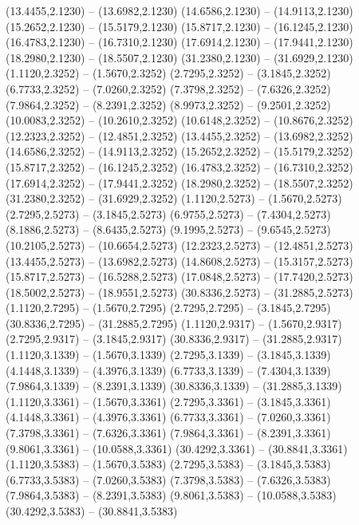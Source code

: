 {\begin{scope}[shift={(#1,#2)}]
    (13.4455,2.1230) -- (13.6982,2.1230)
    (14.6586,2.1230) -- (14.9113,2.1230)
    (15.2652,2.1230) -- (15.5179,2.1230)
    (15.8717,2.1230) -- (16.1245,2.1230)
    (16.4783,2.1230) -- (16.7310,2.1230)
    (17.6914,2.1230) -- (17.9441,2.1230)
    (18.2980,2.1230) -- (18.5507,2.1230)
    (31.2380,2.1230) -- (31.6929,2.1230)
    (1.1120,2.3252) -- (1.5670,2.3252)
    (2.7295,2.3252) -- (3.1845,2.3252)
    (6.7733,2.3252) -- (7.0260,2.3252)
    (7.3798,2.3252) -- (7.6326,2.3252)
    (7.9864,2.3252) -- (8.2391,2.3252)
    (8.9973,2.3252) -- (9.2501,2.3252)
    (10.0083,2.3252) -- (10.2610,2.3252)
    (10.6148,2.3252) -- (10.8676,2.3252)
    (12.2323,2.3252) -- (12.4851,2.3252)
    (13.4455,2.3252) -- (13.6982,2.3252)
    (14.6586,2.3252) -- (14.9113,2.3252)
    (15.2652,2.3252) -- (15.5179,2.3252)
    (15.8717,2.3252) -- (16.1245,2.3252)
    (16.4783,2.3252) -- (16.7310,2.3252)
    (17.6914,2.3252) -- (17.9441,2.3252)
    (18.2980,2.3252) -- (18.5507,2.3252)
    (31.2380,2.3252) -- (31.6929,2.3252)
    (1.1120,2.5273) -- (1.5670,2.5273)
    (2.7295,2.5273) -- (3.1845,2.5273)
    (6.9755,2.5273) -- (7.4304,2.5273)
    (8.1886,2.5273) -- (8.6435,2.5273)
    (9.1995,2.5273) -- (9.6545,2.5273)
    (10.2105,2.5273) -- (10.6654,2.5273)
    (12.2323,2.5273) -- (12.4851,2.5273)
    (13.4455,2.5273) -- (13.6982,2.5273)
    (14.8608,2.5273) -- (15.3157,2.5273)
    (15.8717,2.5273) -- (16.5288,2.5273)
    (17.0848,2.5273) -- (17.7420,2.5273)
    (18.5002,2.5273) -- (18.9551,2.5273)
    (30.8336,2.5273) -- (31.2885,2.5273)
    (1.1120,2.7295) -- (1.5670,2.7295)
    (2.7295,2.7295) -- (3.1845,2.7295)
    (30.8336,2.7295) -- (31.2885,2.7295)
    (1.1120,2.9317) -- (1.5670,2.9317)
    (2.7295,2.9317) -- (3.1845,2.9317)
    (30.8336,2.9317) -- (31.2885,2.9317)
    (1.1120,3.1339) -- (1.5670,3.1339)
    (2.7295,3.1339) -- (3.1845,3.1339)
    (4.1448,3.1339) -- (4.3976,3.1339)
    (6.7733,3.1339) -- (7.4304,3.1339)
    (7.9864,3.1339) -- (8.2391,3.1339)
    (30.8336,3.1339) -- (31.2885,3.1339)
    (1.1120,3.3361) -- (1.5670,3.3361)
    (2.7295,3.3361) -- (3.1845,3.3361)
    (4.1448,3.3361) -- (4.3976,3.3361)
    (6.7733,3.3361) -- (7.0260,3.3361)
    (7.3798,3.3361) -- (7.6326,3.3361)
    (7.9864,3.3361) -- (8.2391,3.3361)
    (9.8061,3.3361) -- (10.0588,3.3361)
    (30.4292,3.3361) -- (30.8841,3.3361)
    (1.1120,3.5383) -- (1.5670,3.5383)
    (2.7295,3.5383) -- (3.1845,3.5383)
    (6.7733,3.5383) -- (7.0260,3.5383)
    (7.3798,3.5383) -- (7.6326,3.5383)
    (7.9864,3.5383) -- (8.2391,3.5383)
    (9.8061,3.5383) -- (10.0588,3.5383)
    (30.4292,3.5383) -- (30.8841,3.5383)

\end{scope}}
